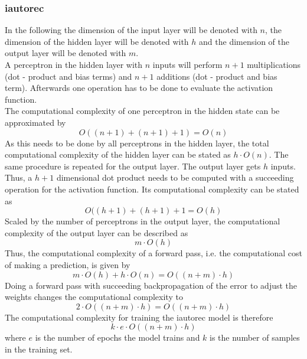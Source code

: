 \subsubsection{\acrshort{iautorec}}
In the following the dimension of the input layer will be denoted with $n$, the dimension of the hidden layer will be denoted with $h$ and the dimension of the output layer will be denoted with $m$.\\
A perceptron in the hidden layer with $n$ inputs will perform $n + 1$ multiplications (dot - product and bias terms) and $n + 1$ additions (dot - product and bias term). Afterwards one operation has to be done to evaluate the activation function.\\
The computational complexity of one perceptron in the hidden state can be approximated by\\
\begin{equation}
    O((n+1) + (n+1) + 1) = O(n)
\end{equation} 
As this needs to be done by all perceptrons in the hidden layer, the total computational complexity of the hidden layer can be stated as $h \cdot O(n)$. The same procedure is repeated for the output layer. The output layer gets $h$ inputs. Thus, a $h + 1$ dimensional dot product needs to be computed with a succeeding operation for the activation function. Its computational complexity can be stated as\\
\begin{equation}
    O((h +1) + (h + 1) + 1 = O(h)
\end{equation}
Scaled by the number of perceptrons in the output layer, the computational complexity of the output layer can be described as\\
\begin{equation}
    m \cdot O(h)
\end{equation}
Thus, the computational complexity of a forward pass, i.e. the computational cost of making a prediction, is given by\\
\begin{equation}
    m \cdot O(h) + h \cdot O(n) = O((n + m) \cdot h)
\end{equation}
Doing a forward pass with succeeding backpropagation of the error to adjust the weights changes the computational complexity to\\
\begin{equation}
    2 \cdot O((n + m) \cdot h) = O((n + m) \cdot h)
\end{equation}
The computational complexity for training the \acrshort{iautorec} model is therefore\\
\begin{equation}
    k \cdot e \cdot O((n + m) \cdot h)
\end{equation}
where $e$ is the number of epochs the model trains and $k$ is the number of samples in the training set.


